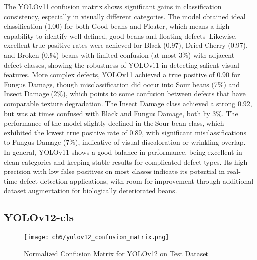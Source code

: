 The YOLOv11 confusion matrix shows significant gains in classification consistency, especially in visually different categories. The model obtained ideal classification (1.00) for both Good beans and Floater, which means a high capability to identify well-defined, good beans and floating defects. Likewise, excellent true positive rates were achieved for Black (0.97), Dried Cherry (0.97), and Broken (0.94) beans with limited confusion (at most 3\%) with adjacent defect classes, showing the robustness of YOLOv11 in detecting salient visual features. More complex defects, YOLOv11 achieved a true positive of 0.90 for Fungus Damage, though misclassification did occur into Sour beans (7\%) and Insect Damage (2\%), which points to some confusion between defects that have comparable texture degradation. The Insect Damage class achieved a strong 0.92, but was at times confused with Black and Fungus Damage, both by 3\%. The performance of the model slightly declined in the Sour bean class, which exhibited the lowest true positive rate of 0.89, with significant misclassifications to Fungus Damage (7\%), indicative of visual discoloration or wrinkling overlap. In general, YOLOv11 shows a good balance in performance, being excellent in clean categories and keeping stable results for complicated defect types. Its high precision with low false positives on most classes indicate its potential in real-time defect detection applications, with room for improvement through additional dataset augmentation for biologically deteriorated beans.

\subsection{YOLOv12-cls}

\begin{figure}[H]
    \centering
    \texttt{[image: ch6/yolov12\_confusion\_matrix.png]} %
    \caption{Normalized Confusion Matrix for YOLOv12 on Test Dataset}
    \label{fig:yolov12_conf_matrix}
\end{figure}

